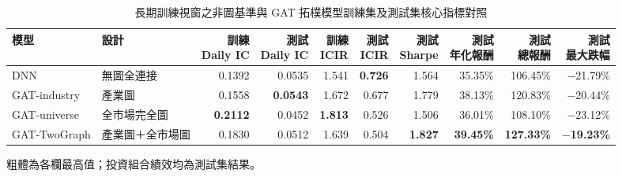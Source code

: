 \begin{table}[H]
\centering
\caption{長期訓練視窗之非圖基準與 GAT 拓樸模型訓練集及測試集核心指標對照}
\label{tab:results_long_topology_train_test}
\begingroup
\scriptsize
\setlength{\tabcolsep}{4pt}
\renewcommand{\arraystretch}{1.10}
\begin{adjustbox}{max width=\textwidth}
\begin{tabular}{@{}lp{3.0cm}rrrrrrrr@{}}
\toprule
模型 & 設計 &
\makecell[r]{訓練\\Daily IC} & \makecell[r]{測試\\Daily IC} &
\makecell[r]{訓練\\ICIR} & \makecell[r]{測試\\ICIR} &
\makecell[r]{測試\\Sharpe} & \makecell[r]{測試\\年化報酬} &
\makecell[r]{測試\\總報酬} & \makecell[r]{測試\\最大跌幅} \\
\midrule
DNN            & 無圖全連接
  & 0.1392 & 0.0535 & 1.541 & \textbf{0.726} & 1.564 & 35.35\% & 106.45\% & $-$21.79\% \\
GAT-industry   & 產業圖
  & 0.1558 & \textbf{0.0543} & 1.672 & 0.677 & 1.779 & 38.13\% & 120.83\% & $-$20.44\% \\
GAT-universe   & 全市場完全圖
  & \textbf{0.2112} & 0.0452 & \textbf{1.813} & 0.526 & 1.506 & 36.01\% & 108.10\% & $-$23.12\% \\
GAT-TwoGraph   & 產業圖＋全市場圖
  & 0.1830 & 0.0512 & 1.639 & 0.504 & \textbf{1.827} & \textbf{39.45\%} & \textbf{127.33\%} & \textbf{$-$19.23\%} \\
\bottomrule
\end{tabular}
\end{adjustbox}
\smallskip

{\footnotesize 粗體為各欄最高值；投資組合績效均為測試集結果。}
\endgroup
\end{table}
